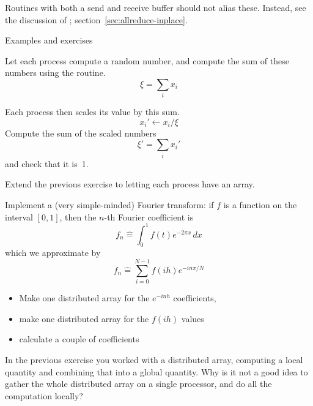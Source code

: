 \begin{remark}
  Routines with both a send and receive buffer should not alias these.
  Instead, see the discussion of ;
  section~\ref{sec:allreduce-inplace}.
\end{remark}

 {Examples and exercises}

\begin{exercise}
  \label{ex:randommaxscale}
  Let each process compute a random number,
  and compute the sum of these numbers using the 
  routine.
  \[ \xi = \sum_i x_i \]

  Each process then scales its value
  by this sum.
  \[ x_i' \leftarrow x_i/ \xi \]
  Compute the sum of the scaled numbers
  \[ \xi' = \sum_i x_i' \]
  and check that it is~1.
\end{exercise}

\begin{exercise}
  \label{ex:randommaxarray}
  Extend the previous exercise to letting each process have an array.
\end{exercise}

\begin{exercise}
  \label{ex:fft-vector}
  Implement a (very simple-minded) Fourier transform: if $f$ is a
  function on the interval $[0,1]$, then the $n$-th Fourier
  coefficient is
  \[ f_n\hat = \int_0^1 f(t)e^{-2\pi x}\,dx \]
  which we approximate by
  \[ f_n\hat = \sum_{i=0}^{N-1} f(ih)e^{-in\pi/N} \]
  \begin{itemize}
  \item Make one distributed array for the $e^{-inh}$ coefficients,
  \item make one distributed array for the $f(ih)$ values
  \item calculate a couple of coefficients
  \end{itemize}
\end{exercise}

\begin{exercise}
  In the previous exercise you worked with a distributed array,
  computing a local quantity and combining that into a global
  quantity.
  Why is it not a good idea to gather the whole distributed array on a
  single processor, and do all the computation locally?
\end{exercise}

